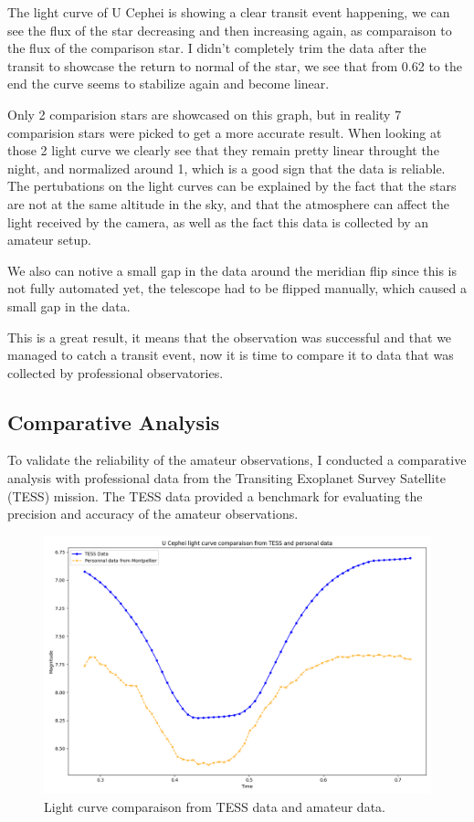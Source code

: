 \documentclass[12pt,a4paper]{article}
\begin{document}
The light curve of U Cephei is showing a clear transit event happening, we can see the flux of the star decreasing and then increasing again, as comparaison to the flux of the comparison star.
I didn't completely trim the data after the transit to showcase the return to normal of the star, we see that from 0.62 to the end the curve seems to stabilize again and become linear.

Only 2 comparision stars are showcased on this graph, but in reality 7 comparision stars were picked to get a more accurate result. When looking at those 2 light curve we clearly see that they remain pretty linear throught the night,
and normalized around 1, which is a good sign that the data is reliable. The pertubations on the light curves can be explained by the fact that the stars are not at the same altitude in the sky, and that the atmosphere can affect the light received by the camera, as well as the fact
this data is collected by an amateur setup.


We also can notive a small gap in the data around the meridian flip since this is not fully automated yet, the telescope had to be flipped manually, which caused a small gap in the data.

\bigskip

This is a great result, it means that the observation was successful and that we managed to catch a transit event, now it is time to compare it to data that was collected by professional observatories.

\subsection{Comparative Analysis}

To validate the reliability of the amateur observations, I conducted a comparative analysis with professional data from the Transiting Exoplanet Survey Satellite (TESS) mission. The TESS data provided a benchmark for evaluating the precision and accuracy of the amateur observations.


\begin{figure}[h]
    \centering
    \includegraphics[width=1\textwidth]{assets/comparaison.png}
    \caption{Light curve comparaison from TESS data and amateur data.}
    \label{fig:light_curve}
\end{figure}
\end{document}
